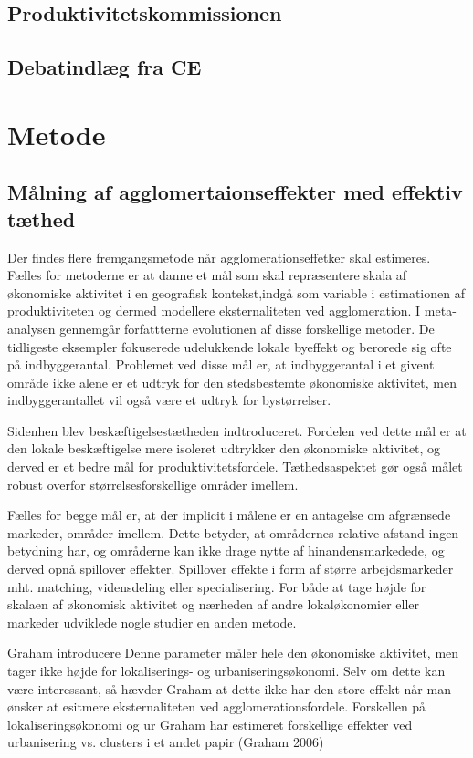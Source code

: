 \documentclass[a4paper, 12pt, titlepage]{article}
\begin{document}
\subsection{Produktivitetskommissionen}
\subsection{Debatindlæg fra CE}
\section{Metode}
\subsection{Målning af agglomertaionseffekter med effektiv tæthed }

Der findes flere fremgangsmetode når agglomerationseffetker skal estimeres. Fælles for metoderne er at danne et mål som skal repræsentere skala af økonomiske aktivitet i en geografisk kontekst,indgå som variable i estimationen af produktiviteten og dermed modellere eksternaliteten ved agglomeration. I meta-analysen \cite{melo2009meta} gennemgår forfattterne evolutionen af disse forskellige metoder. De tidligeste eksempler fokuserede udelukkende lokale byeffekt og berorede sig ofte på indbyggerantal. Problemet ved disse mål er, at indbyggerantal i et givent område ikke alene er et udtryk for den stedsbestemte økonomiske aktivitet, men indbyggerantallet vil også være et udtryk for bystørrelser.

Sidenhen blev beskæftigelsestætheden indtroduceret. Fordelen ved dette mål er at den lokale beskæftigelse mere isoleret udtrykker den økonomiske aktivitet, og derved er et bedre mål for produktivitetsfordele. Tæthedsaspektet gør også målet robust overfor størrelsesforskellige områder imellem. 

Fælles for begge mål er, at der implicit i målene er en antagelse om afgrænsede markeder, områder imellem. Dette betyder, at områdernes relative afstand ingen betydning har, og områderne kan ikke drage nytte af hinandensmarkedede, og derved opnå spillover effekter. Spillover effekte i form af større arbejdsmarkeder mht. matching, vidensdeling eller specialisering. For både at tage højde for skalaen af økonomisk aktivitet og nærheden af andre lokaløkonomier eller markeder udviklede nogle studier en anden metode.  

Graham introducere Denne parameter måler hele den økonomiske aktivitet, men tager ikke højde for lokaliserings- og urbaniseringsøkonomi. Selv om dette kan være interessant, så hævder Graham at dette ikke har den store effekt når man ønsker at esitmere eksternaliteten ved agglomerationsfordele. Forskellen på lokaliseringsøkonomi og ur
Graham har estimeret forskellige effekter ved urbanisering vs. clusters i et andet papir (Graham 2006) 
\end{document}
